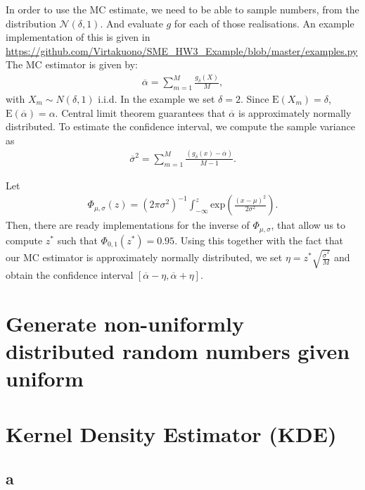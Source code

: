 \documentclass[a4paper,11pt]{article}
\newcommand{\expf}[1]{\mathrm{exp}\left ( {#1}\right )}
\newcommand{\parent}[1]{\left( {#1} \right)}
\newcommand{\ssum}[2]{\displaystyle\sum\limits_{#1}^{#2}}
\newcommand{\expp}[1]{\mathrm{E} \parent{{#1}}}
\begin{document}
In order to use the MC estimate, we need to be able to sample numbers, from
the distribution $\mathcal N \parent{\delta,1}$. And evaluate $g$ for each of those realisations.
An example implementation of this is given in \url{https://github.com/Virtakuono/SME_HW3_Example/blob/master/examples.py}
The MC estimator is given by:
\begin{align}
\overline \alpha = \ssum{m =1}{M} \frac{g_\delta \parent{X}}{M},
\end{align}
with $X_m \sim  N \parent{\delta,1}$ i.i.d. In the example we set $\delta=2$.
Since $\expp{X_m} = \delta$, $\expp{\overline \alpha} = \alpha$. Central
limit theorem guarantees that $\overline \alpha$ is approximately normally
distributed. To estimate the confidence interval, we compute the sample variance
as
\begin{align}
\overline \sigma^2 = \ssum{m=1}{M} \frac{\parent{g_\delta \parent{x}- \overline \alpha}}{M-1}.
\end{align}

Let
\begin{align}
\Phi_{\mu,\sigma} \parent{z} = \parent{ 2 \pi \sigma^2}^{-1}  \int_{-\infty}^z \expf{\frac{\parent{x-\mu}^2}{2 \sigma^2}}.
\end{align}
Then, there are ready implementations for the inverse of $\Phi_{\mu,\sigma}$, that
allow us to compute $z^*$ such that $\Phi_{0,1} \parent{z^*} = 0.95$. Using this
together with the fact that our MC estimator is approximately normally distributed,
we set $\eta = z^* \sqrt{\frac{\overline \sigma^2}{M}}$ and obtain the confidence interval
$[\overline \alpha - \eta, \overline \alpha + \eta]$.


\section*{Generate non-uniformly distributed random numbers given uniform}

\section*{Kernel Density Estimator (KDE)}

\subsection*{a}
\end{document}
